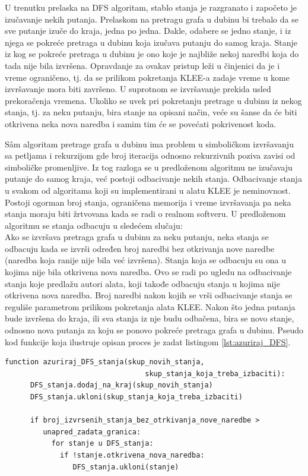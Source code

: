 \documentclass[12pt,oneside]{memoir}
\begin{document}
U trenutku prelaska na DFS algoritam, stablo stanja je razgranato i započeto je izučavanje nekih putanja. Prelaskom na pretragu grafa u dubinu bi trebalo da se sve putanje izuče do kraja, jedna po jedna. Dakle, odabere se jedno stanje, i iz njega se pokreće pretraga u dubinu koja izučava putanju do samog kraja. Stanje iz kog se pokreće pretraga u dubinu je ono koje je najbliže nekoj naredbi koja do tada nije bila izvršena. Opravdanje za ovakav pristup leži u činjenici da je i vreme ograničeno, tj. da se prilikom pokretanja KLEE-a zadaje vreme u kome izvršavanje mora biti završeno. U suprotnom se izvršavanje prekida usled prekoračenja vremena. Ukoliko se uvek pri pokretanju pretrage u dubinu iz nekog stanja, tj. za neku putanju, bira stanje na opisani način, veće su šanse da će biti otkrivena neka nova naredba i samim tim će se povećati pokrivenost koda. 

S\^am algoritam pretrage grafa u dubinu ima problem u simboličkom izvršavanju sa petljama i rekurzijom gde broj iteracija odnosno rekurzivnih poziva zavisi od simboličke promenljive. Iz tog razloga se u predloženom algoritmu ne izučavaju putanje do samog kraja, već postoji odbacivanje nekih stanja. Odbacivanje stanja u svakom od algoritama koji su implementirani u alatu KLEE je neminovnost. Postoji ogorman broj stanja, ograničena memorija i vreme izvršavanja pa neka stanja moraju biti žrtvovana kada se radi o realnom softveru. U predloženom algoritmu se stanja odbacuju u sledećem slučaju: \\
Ako se izvršava pretraga grafa u dubinu za neku putanju, neka stanja se odbacuju kada se izvrši određen broj naredbi bez otkrivanja nove naredbe (naredba koja ranije nije bila već izvršena). Stanja koja se odbacuju su ona u kojima nije bila otkrivena nova naredba.
Ovo se radi po ugledu na odbacivanje stanja koje predlažu autori alata, koji takođe odbacuju stanja u kojima nije otkrivena nova naredba. Broj naredbi nakon kojih se vrši odbacivanje stanja se reguliše parametrom prilikom pokretanja alata KLEE. Nakon što jedna putanja bude izvršena do kraja, ili sva stanja iz nje budu odbačena, bira se novo stanje, odnosno nova putanja za koju se ponovo pokreće pretraga grafa u dubinu. Pseudo kod funkcije koja ilustruje opisan proces je zadat listingom \ref{lst:azuriraj_DFS}.

    \begin{lstlisting}[caption={Pseudokod funkcije za ažuriranje DFS stanja},captionpos=b,label={lst:azuriraj_DFS}]
    function azuriraj_DFS_stanja(skup_novih_stanja, 
                                 skup_stanja_koja_treba_izbaciti):
      DFS_stanja.dodaj_na_kraj(skup_novih_stanja)
      DFS_stanja.ukloni(skup_stanja_koja_treba_izbaciti)        
            
      if broj_izvrsenih_stanja_bez_otrkivanja_nove_naredbe > 
         unapred_zadata_granica:
           for stanje u DFS_stanja:
             if !stanje.otkrivena_nova_naredba:
                DFS_stanja.ukloni(stanje)
    \end{lstlisting}
\end{document}
